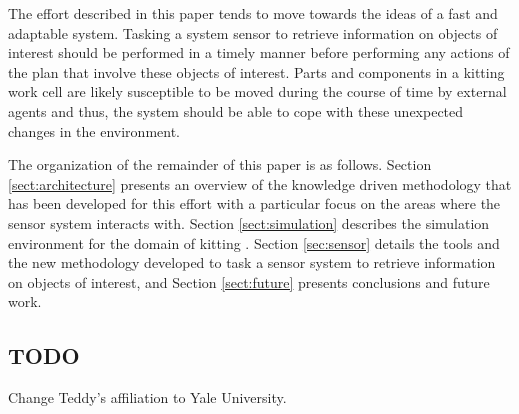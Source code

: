 The effort described in this paper tends to move towards the ideas of a fast and adaptable system. Tasking a system sensor to retrieve information on objects of interest should be performed in a timely manner before performing any actions of the plan that involve these objects of interest. Parts and components in a kitting work cell are likely susceptible to be moved during the course of time by external agents and thus, the system should be able to cope with these unexpected changes in the environment.




The organization of the remainder of this paper is as follows. Section \ref{sect:architecture} presents an overview of the knowledge driven methodology that has been developed for this effort with a particular focus on the areas where the sensor system interacts with. Section \ref{sect:simulation} describes the simulation environment for the domain of kitting . Section \ref{sec:sensor} details the tools and the new methodology developed to task a sensor system to retrieve information on objects of interest, and Section \ref{sect:future} presents conclusions and future work.

\subsection{TODO}
Change Teddy's affiliation to Yale University.